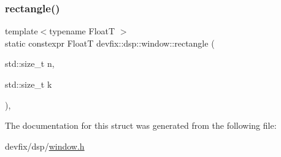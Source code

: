 \mbox{\label{structdevfix_1_1dsp_1_1window_a15b34e7a9a7b76046b63347ac56b3236}} 
\subsubsection{\texorpdfstring{rectangle()}{rectangle()}}
{\footnotesize\ttfamily template$<$typename FloatT $>$ \\
static constexpr FloatT devfix\+::dsp\+::window\+::rectangle (\begin{DoxyParamCaption}\item[{std\+::size\+\_\+t}]{n,  }\item[{std\+::size\+\_\+t}]{k }\end{DoxyParamCaption})\hspace{0.3cm}{\ttfamily [inline]}, {\ttfamily [static]}}



The documentation for this struct was generated from the following file\+:\begin{DoxyCompactItemize}
\item 
devfix/dsp/\hyperlink{window_8h}{window.\+h}\end{DoxyCompactItemize}
